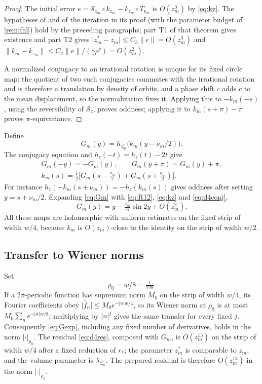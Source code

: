 \documentclass[11pt]{amsart}
\numberwithin{equation}{section}
\theoremstyle{definition}
\theoremstyle{remark}
\newcommand{\abs}[1]{\lvert #1\rvert}
\newcommand{\norm}[1]{\lVert #1\rVert}
\begin{document}
\begin{proof}
The initial error $e=\mathcal S_{z_m}\circ k_{z_m}-k_{z_m}\circ T_{\nu_m}$ is $O(z_m^3)$ by \eqref{eq:kz}. The hypotheses of \cite[Theorem~3.1]{FHL} and of the iteration in its proof (with the parameter budget of \cref{rem:fhl}) hold by the preceding paragraphs; part T1 of that theorem gives existence and part T2 gives $\abs{z^*_m-z_m}\le C_3\norm e=O(z_m^3)$ and $\norm{k_m-k_{z_m}}\le C_2\norm e/(\gamma\rho^\tau)=O(z_m^2)$.

A normalized conjugacy to an irrational rotation is unique for its fixed circle map: the quotient of two such conjugacies commutes with the irrational rotation and is therefore a translation by density of orbits, and a phase shift $c$ adds $c$ to the mean displacement, so the normalization fixes it. Applying this to $-k_m(-s)$, using the reversibility of $\mathcal S_z$, proves oddness; applying it to $k_m(s+\pi)-\pi$ proves $\pi$-equivariance.
\end{proof}

Define
\begin{equation}\label{eq:Gm}
G_m(y)=h_{z_m^*}\bigl(k_m(y-\nu_m/2)\bigr).
\end{equation}
The conjugacy equation and $h_z(-t)=h_z(t)-2t$ give
\begin{equation}\label{eq:Gsym}
\begin{gathered}
G_m(-y)=-G_m(y),\qquad G_m(y+\pi)=G_m(y)+\pi,\\
k_m(s)=\tfrac12\bigl[G_m(s-\tfrac{\nu_m}2)+G_m(s+\tfrac{\nu_m}2)\bigr].
\end{gathered}
\end{equation}
For instance $h_z(-k_m(s+\nu_m))=-h_z(k_m(s))$ gives oddness after setting $y=s+\nu_m/2$. Expanding \eqref{eq:Gm} with \eqref{eq:R12}, \eqref{eq:kz} and \eqref{eq:d4conj},
\begin{equation}\label{eq:Gexp}
G_m(y)=y-\tfrac{z_m}6\sin2y+O(z_m^2).
\end{equation}
All these maps are holomorphic with uniform estimates on the fixed strip of width $w/4$, because $k_m$ is $O(z_m)$-close to the identity on the strip of width $w/2$.

\subsection{Transfer to Wiener norms}
Set
\begin{equation}\label{eq:rho0}
\rho_0=w/8=\tfrac1{128}.
\end{equation}
If a $2\pi$-periodic function has supremum norm $M_0$ on the strip of width $w/4$, its Fourier coefficients obey $\abs{\hat f_n}\le M_0e^{-\abs nw/4}$, so its Wiener norm at $\rho_0$ is at most $M_0\sum_ne^{-\abs nw/8}$; multiplying by $\abs n^j$ gives the same transfer for every fixed $j$. Consequently \eqref{eq:Gexp}, including any fixed number of derivatives, holds in the norm $\abs\cdot_{\rho_0}$. The residual \eqref{eq:d4res}, composed with $G_m$, is $O(z_m^{13})$ on the strip of width $w/4$ after a fixed reduction of $r_*$; the parameter $z^*_m$ is comparable to $z_m$, and the volume parameter is $\lambda_{z_m^*}$. The prepared residual is therefore $O(z_m^{13})$ in the norm $\abs\cdot_{\rho_0}$.
\end{document}
